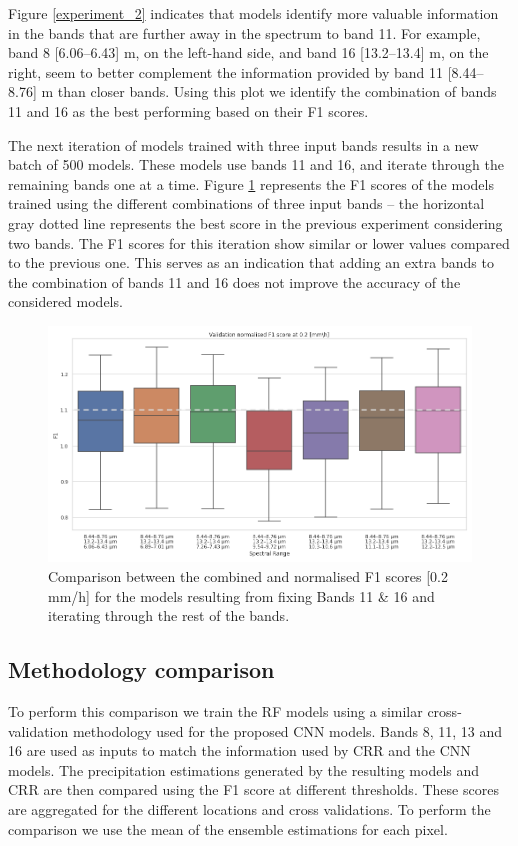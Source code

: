 \documentclass[3p,times]{elsarticle}
\begin{document}
Figure \ref{experiment_2} indicates that models identify more valuable information in the bands that are further away in the spectrum to band 11. For example, band 8 [6.06–6.43] \textmu m, on the left-hand side, and band 16 [13.2–13.4] \textmu m, on the right, seem to better complement the information provided by band 11 [8.44–8.76] \textmu m than closer bands. Using this plot we identify the combination of bands 11 and 16 as the best performing based on their F1 scores.

The next iteration of models trained with three input bands results in a new batch of 500 models. These models use bands 11 and 16, and iterate through the remaining bands one at a time. Figure \ref{experiment_3} represents the F1 scores of the models trained using the different combinations of three input bands -- the horizontal gray dotted line represents the best score in the previous experiment considering two bands. The F1 scores for this iteration show similar or lower values compared to the previous one. This serves as an indication that adding an extra bands to the combination of bands 11 and 16 does not improve the accuracy of the considered models.

\begin{figure}%
    \includegraphics[width=14cm]{figure4.png}
    \caption{Comparison between the combined and normalised F1 scores [0.2 mm/h] for the models resulting from fixing Bands 11 \& 16 and iterating through the rest of the bands.}%
    \label{experiment_3}%
\end{figure}

\subsection{Methodology comparison}

To perform this comparison we train the RF models using a similar cross-validation methodology used for the proposed CNN models. Bands 8, 11, 13 and 16 are used as inputs to match the information used by CRR and the CNN models. The precipitation estimations generated by the resulting models and CRR are then compared using the F1 score at different thresholds. These scores are aggregated for the different locations and cross validations. To perform the comparison we use the mean of the ensemble estimations for each pixel.
\end{document}
